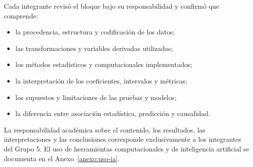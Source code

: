 Cada integrante revisó el bloque bajo su responsabilidad y confirmó que
comprende:

\begin{itemize}
    \item la procedencia, estructura y codificación de los datos;

    \item las transformaciones y variables derivadas utilizadas;

    \item los métodos estadísticos y computacionales implementados;

    \item la interpretación de los coeficientes, intervalos y métricas;

    \item los supuestos y limitaciones de las pruebas y modelos;

    \item la diferencia entre asociación estadística, predicción y
    causalidad.
\end{itemize}

La responsabilidad académica sobre el contenido, los resultados, las
interpretaciones y las conclusiones corresponde exclusivamente a los
integrantes del Grupo 5. El uso de herramientas computacionales y de
inteligencia artificial se documenta en el
Anexo~\ref{anexo:uso-ia}.